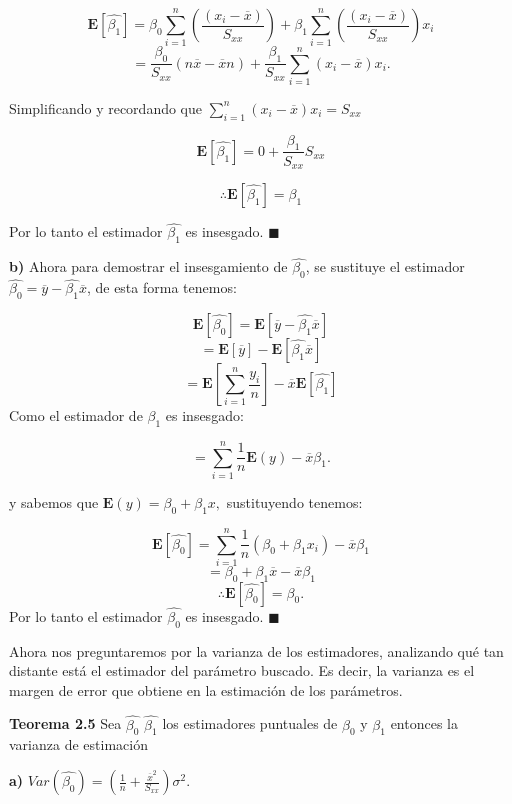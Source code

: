 \documentclass[
  a4paper,
  oneside,
  openany]{book}
\begin{document}
\[\mathbf{E}\left[\hat{\beta_{1}}\right]=\beta_{0}\sum_{i=1}^{n}\left(\frac{(x_{i}-\overline{x})}{S_{xx}}\right)+\beta_{1}\sum_{i=1}^{n}\left(\frac{(x_{i}-\overline{x})}{S_{xx}}\right)x_{i}\]
\[=\frac{\beta_{0}}{S_{xx}}(n\overline{x}-\overline{x}n)+\frac{\beta_{1}}{S_{xx}}\sum_{i=1}^{n}(x_{i}-\overline{x})x_{i}.\]

Simplificando y recordando que \(\sum_{i=1}^{n}(x_{i}-\overline{x})x_{i}=S_{xx}\)

\[\mathbf{E}\left[\hat{\beta_{1}}\right]=0+\frac{\beta_{1}}{S_{xx}}S_{xx}\]

\[\therefore \mathbf{E}\left[\hat{\beta_{1}}\right]=\beta_{1}\]

Por lo tanto el estimador \(\hat{\beta_{1}}\) es insesgado. \(\blacksquare\)

\textbf{b)} Ahora para demostrar el insesgamiento de \(\hat{\beta_{0}}\), se sustituye el estimador \(\hat{\beta_{0}}=\overline{y}-\hat{\beta_{1}}\overline{x}\), de esta forma tenemos:

\[\mathbf{E}\left[\hat{\beta_{0}}\right]=\mathbf{E}\left[\overline{y}-\hat{\beta_{1}}\overline{x}\right]\]
\[=\mathbf{E}\left[\overline{y}\right]-\mathbf{E}\left[\hat{\beta_{1}}\overline{x}\right]\]
\[=\mathbf{E}\left[\sum_{i=1}^{n}\frac{y_{i}}{n}\right]-\overline{x}\mathbf{E}\left[\hat{\beta_{1}}\right]\]
Como el estimador de \(\beta_{1}\) es insesgado:

\[=\sum_{i=1}^{n}\frac{1}{n}\mathbf{E}\left(y\right)-\overline{x}\beta_{1}.\]

y sabemos que \(\mathbf{E}(y)=\beta_{0}+\beta_{1}x,\) sustituyendo tenemos:

\[\mathbf{E}\left[\hat{\beta_{0}}\right]=\sum_{i=1}^{n}\frac{1}{n}(\beta_{0}+\beta_{1}x_{i})-\overline{x}\beta_{1}\]
\[=\beta_{0}+\beta_{1}\overline{x}-\overline{x}\beta_{1}\]
\[\therefore \mathbf{E}[\hat{\beta_{0}}]=\beta_{0}.\]
Por lo tanto el estimador \(\hat{\beta_{0}}\) es insesgado. \(\blacksquare\)

Ahora nos preguntaremos por la varianza de los estimadores, analizando qué tan distante está el estimador del parámetro buscado. Es decir, la varianza es el margen de error que obtiene en la estimación de los parámetros.

\textbf{Teorema 2.5} Sea \(\hat{\beta_{0}}\) \(\hat{\beta_{1}}\) los estimadores puntuales de \(\beta_{0}\) y \(\beta_{1}\) entonces la varianza de estimación

\textbf{a)} \(Var\left(\hat{\beta_{0}}\right)=\left(\frac{1}{n}+\frac{\overline{x}^2}{S_{xx}}\right) \sigma^2.\)
\end{document}
